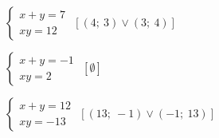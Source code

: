 \begin{esercizio}[\Ast]
\begin{multicols}{2}
\begin{enumeratea}
 \item~$\left\{\begin{array}{l}x+y=7\\{xy}=12 \end{array}\right.$
  \hfill$\left[(4;~3)\vee(3;~4)\right]$
 \item~$\left\{\begin{array}{l}x+y=-1\\{xy}=2 \end{array}\right.$
  \hfill$\left[\emptyset\right]$
 \item~$\left\{\begin{array}{l}x+y=12\\{xy}=-13 \end{array}\right.$
  \hfill$\left[(13;~-1)\vee(-1;~13)\right]$
 \end{enumeratea}
 \end{multicols}
\end{esercizio}

